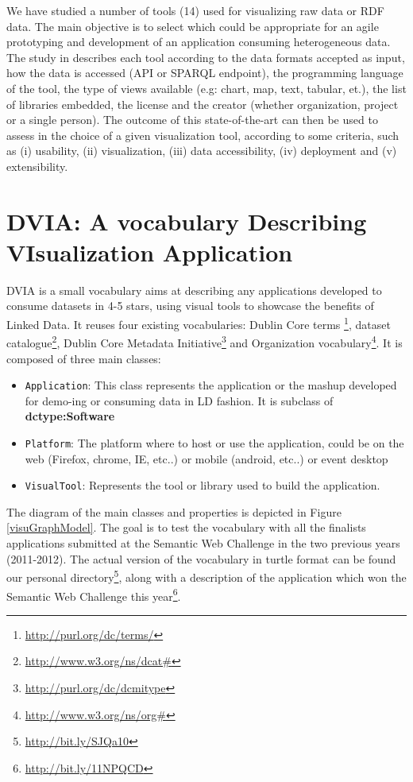 \documentclass[a4paper,11pt]{report}
\begin{document}
We have studied a number of tools (14) used for visualizing raw data or RDF data. The main objective is to select which could be appropriate for an agile prototyping and development of an application consuming heterogeneous data. 
The study in \cite{deliverable2012b} describes each tool according to the data formats accepted as input, how the data is accessed (API or SPARQL endpoint), the programming language of the tool, the type of views available (e.g: chart, map, text, tabular, et.), the list of libraries embedded, the license and the creator (whether organization, project or a single person). The outcome of this state-of-the-art can then be used to assess in the choice of a given visualization tool, according to some criteria, such as (i) usability, (ii) visualization, (iii) data accessibility, (iv) deployment and (v) extensibility. 



\section{DVIA: A vocabulary   Describing VIsualization Application}
DVIA is a small vocabulary aims at describing any applications developed to consume datasets in 4-5 stars, using visual tools to showcase the benefits of Linked Data. It reuses four existing vocabularies: Dublin Core terms \footnote{\url{http://purl.org/dc/terms/}}, dataset catalogue\footnote{\url{http://www.w3.org/ns/dcat#}}, Dublin Core Metadata Initiative\footnote{\url{http://purl.org/dc/dcmitype}} and Organization vocabulary\footnote{\url{http://www.w3.org/ns/org#}}.  It is composed of three main classes: 

\begin{itemize}
\item \texttt{Application}: This class represents the application or the mashup developed for demo-ing or consuming data in LD fashion. It is subclass of \textbf{dctype:Software}
\item \texttt{Platform}: The platform where to host or use the application, could be on the web (Firefox, chrome, IE, etc..) or mobile (android, etc..) or event desktop
\item \texttt{VisualTool}: Represents the tool or library used to build the application. 
\end{itemize}

The diagram of the main classes and properties is depicted in Figure \ref{visuGraphModel}. The goal is to test the vocabulary with all the finalists applications submitted at the Semantic Web Challenge in  the two previous years (2011-2012). The actual version of the vocabulary in turtle format can be found our personal directory\footnote{\url{http://bit.ly/SJQa10}}, along with a description of the application which won the Semantic Web Challenge this year\footnote{\url{ http://bit.ly/11NPQCD}}.
\end{document}
